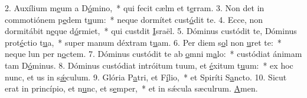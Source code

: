 2. Auxílium m\uline{e}um a D\uline{ó}mino,~* qui fecit cælm et t\uline{e}rram.
3. Non det in commotiónem p\uline{e}dem t\uline{u}um:~* neque dormítet  cust\uline{ó}dit te.
4. Ecce, non dormitábit n\uline{e}que d\uline{ó}rmiet,~* qui custdit \uline{I}sraël.
5. Dóminus custódit te, Dóminus prot\uline{é}ctio t\uline{u}a,~* super manum déxtram t\uline{u}am.
6. Per diem s\uline{o}l non \uline{u}ret te:~* neque lun per n\uline{o}ctem.
7. Dóminus custódit te ab \uline{o}mni m\uline{a}lo:~* custódiat ánimam tam D\uline{ó}minus.
8. Dóminus custódiat intróitum tuum, et \uline{é}xitum t\uline{u}um:~* ex hoc nunc, et us in s\uline{ǽ}culum.
9. Glória P\uline{a}tri, et F\uline{í}lio,~* et Spiríti S\uline{a}ncto.
10. Sicut erat in princípio, et n\uline{u}nc, et s\uline{e}mper,~* et in sǽcula sæculrum. \uline{A}men.

